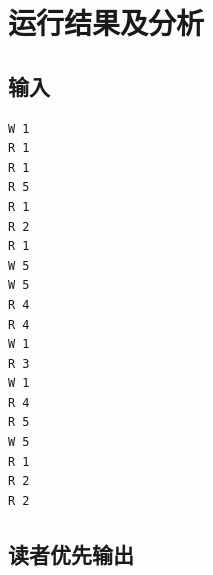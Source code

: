 \documentclass[lang=cn,11pt,a4paper,cite=authornum]{paper}
\begin{document}
\section{运行结果及分析}

\subsection{输入}

\begin{code}
\begin{verbatim}
W 1
R 1
R 1
R 5
R 1
R 2
R 1
W 5
W 5
R 4
R 4
W 1
R 3
W 1
R 4
R 5
W 5
R 1
R 2
R 2
\end{verbatim}
\end{code}

\subsection{读者优先输出}
\end{document}
